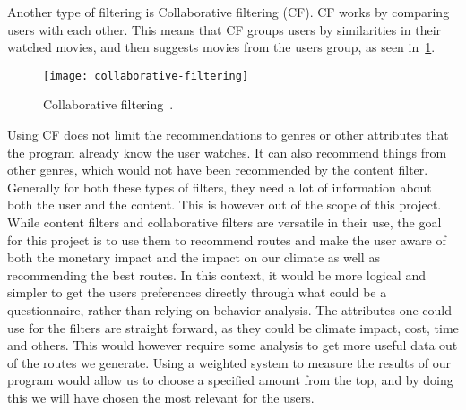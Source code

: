 Another type of filtering is Collaborative filtering (CF).
CF works by comparing users with each other.
This means that CF groups users by similarities in their watched movies, and then suggests movies from the users group,
as seen in~\ref{fig:figure4}.

\begin{figure}
    \centering
    \texttt{[image: collaborative-filtering]}
    \caption{Collaborative filtering~\cite{collaborative_filtering}.}
    \label{fig:figure4}
\end{figure}

Using CF does not limit the recommendations to genres or other attributes that the program already know the user
watches.
It can also recommend things from other genres, which would not have been recommended by the content filter.
Generally for both these types of filters, they need a lot of information about both the user and the content.
This is however out of the scope of this project.
While content filters and collaborative filters are versatile in their use, the goal for this project is to use them to
recommend routes and make the user aware of both the monetary impact and the impact on our climate as well as
recommending the best routes.
In this context, it would be more logical and simpler to get the users preferences directly through what could be a
questionnaire, rather than relying on behavior analysis.
The attributes one could use for the filters are straight forward, as they could be climate impact, cost, time and
others.
This would however require some analysis to get more useful data out of the routes we generate.
Using a weighted system to measure the results of our program would allow us to choose a specified amount from the top,
and by doing this we will have chosen the most relevant for the users.
